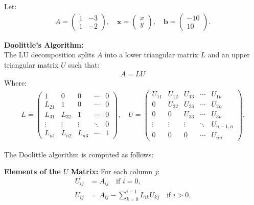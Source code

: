 \documentclass[journal,12pt,onecolumn]{IEEEtran}
\theoremstyle{remark}
\begin{document}
Let:
\begin{align}
    A =
    \begin{pmatrix}
        1 & -3 \\
        1 & -2
    \end{pmatrix},
    \quad
    \mathbf{x} =
    \begin{pmatrix}
        x \\ y
    \end{pmatrix},
    \quad
    \mathbf{b} =
    \begin{pmatrix}
        -10 \\ 10
    \end{pmatrix}.
\end{align}

\textbf{Doolittle's Algorithm:}\\
The LU decomposition splits $A$ into a lower triangular matrix $L$ and an upper triangular matrix $U$ such that:
\begin{align}
    A = LU
\end{align}
Where:
\begin{align}
    L = 
    \begin{pmatrix}
        1 & 0 & 0 & \cdots & 0 \\ 
        L_{21} & 1 & 0 & \cdots & 0 \\ 
        L_{31} & L_{32} & 1 & \cdots & 0 \\ 
        \vdots & \vdots & \vdots & \ddots & 0 \\ 
        L_{n1} & L_{n2} & L_{n3} & \cdots & 1
    \end{pmatrix}, \quad
    U = 
    \begin{pmatrix}
        U_{11} & U_{12} & U_{13} & \cdots & U_{1n} \\ 
        0 & U_{22} & U_{23} & \cdots & U_{2n} \\ 
        0 & 0 & U_{33} & \cdots & U_{3n} \\ 
        \vdots & \vdots & \vdots & \ddots & U_{n-1,n} \\ 
        0 & 0 & 0 & \cdots & U_{nn}
    \end{pmatrix}.
\end{align}

The Doolittle algorithm is computed as follows:

\textbf{Elements of the $U$ Matrix:}  
For each column $j$:
\begin{align}
    U_{ij} &= A_{ij} \quad \text{if } i = 0,\\
    U_{ij} &= A_{ij} - \sum_{k=0}^{i-1} L_{ik} U_{kj} \quad \text{if } i > 0.
\end{align}
\end{document}
